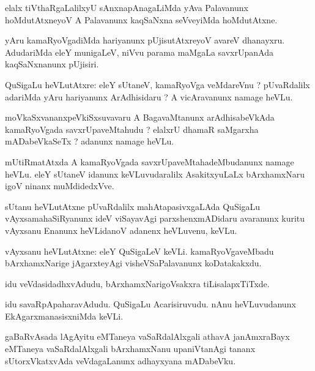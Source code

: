 \documentclass{article}
\begin{document}
\begin{mn}
elalx tiVthaRgaLalilxyU sAnxnapAnagaLiMda yAva Palavanunx hoMdutAtxneyoV A Palavanunx kaqSaNxna 
seVveyiMda hoMdutAtxne.
\end{mn}

\begin{mn}
yAru kamaRyoVgadiMda hariyanunx pUjisutAtxreyoV avareV dhanayxru. AdudariMda eleY munigaLeV, niVvu 
parama maMgaLa savxrUpanAda kaqSaNxnanunx pUjisiri.
\end{mn}


\begin{mn}
QuSigaLu heVLutAtxre: eleY sUtaneV, kamaRyoVga veMdareVnu ? pUvaRdalilx adariMda yAru hariyanunx 
ArAdhisidaru ? A vicAravanunx namage heVLu.
\end{mn}

\begin{mn}
moVkaSxvananxpeVkiSxsuvavaru A BagavaMtanunx arAdhisabeVkAda kamaRyoVgada savxrUpaveMtahudu ? 
elalxrU dhamaR saMgarxha mADabeVkaSeTx ? adanunx namage heVLu.
\end{mn}

\begin{mn}
mUtiRmatAtxda A kamaRyoVgada savxrUpaveMtahadeMbudanunx namage heVLu. eleY sUtaneV idanunx 
keVLuvudaralilx AsakitxyuLaLx bArxhamxNaru igoV ninanx muMdidedxVve.
\end{mn}

\begin{mn}
sUtanu heVLutAtxne pUvaRdalilx mahAtapasivxgaLAda QuSigaLu vAyxsamahaSiRyanunx ideV viSayavAgi 
parxshenxmADidaru avaranunx kuritu vAyxsanu Enanunx heVLidanoV adanenx heVLuvenu, keVLu.
\end{mn}

\begin{mn}
vAyxsanu heVLutAtxne: eleY QuSigaLeV keVLi. kamaRyoVgaveMbadu bArxhamxNarige jAgarxteyAgi 
visheVSaPalavanunx koDatakakxdu.
\end{mn}

\begin{mn}
idu veVdasidadhxvAdudu, bArxhamxNarigoVsakxra tiLisalapxTiTxde.
\end{mn}

\begin{mn}
idu savaRpApaharavAdudu. QuSigaLu Acarisiruvudu. nAnu heVLuvudanunx EkAgarxmanasisxniMda keVLi.
\end{mn}

\begin{mn}
gaBaRvAsada lAgAyitu eMTaneya vaSaRdalAlxgali athavA janAmxraBayx eMTaneya vaSaRdalAlxgali 
bArxhamxNanu upaniVtanAgi tananx sUtorxVkatxvAda veVdagaLanunx adhayxyana mADabeVku.
\end{mn}
\end{document}
